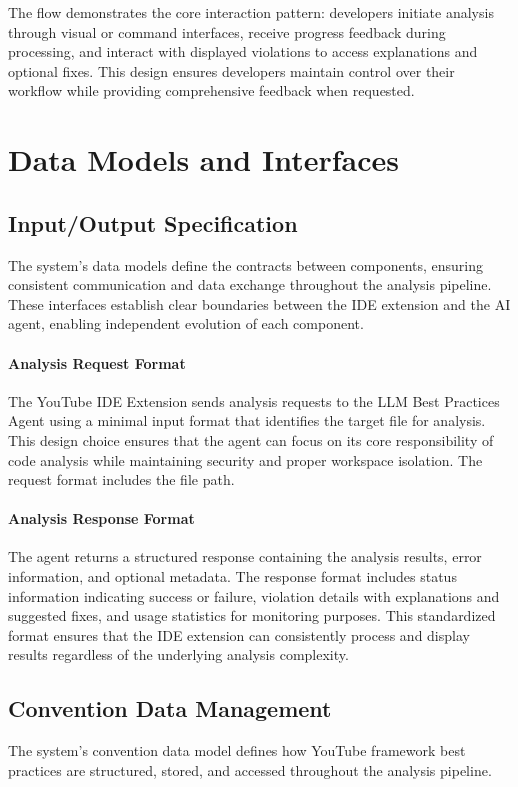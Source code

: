 \begin{spacing}{1.2}
The flow demonstrates the core interaction pattern: developers initiate analysis through visual or command interfaces, receive progress feedback during processing, and interact with displayed violations to access explanations and optional fixes. This design ensures developers maintain control over their workflow while providing comprehensive feedback when requested.


\section{Data Models and Interfaces}

\subsection{Input/Output Specification}
The system's data models define the contracts between components, ensuring consistent communication and data exchange throughout the analysis pipeline. These interfaces establish clear boundaries between the IDE extension and the AI agent, enabling independent evolution of each component.

\paragraph{Analysis Request Format}
The YouTube IDE Extension sends analysis requests to the LLM Best Practices Agent using a minimal input format that identifies the target file for analysis. This design choice ensures that the agent can focus on its core responsibility of code analysis while maintaining security and proper workspace isolation. The request format includes the file path.

\paragraph{Analysis Response Format}
The agent returns a structured response containing the analysis results, error information, and optional metadata. The response format includes status information indicating success or failure, violation details with explanations and suggested fixes, and usage statistics for monitoring purposes. This standardized format ensures that the IDE extension can consistently process and display results regardless of the underlying analysis complexity.

\subsection{Convention Data Management}
The system's convention data model defines how YouTube framework best practices are structured, stored, and accessed throughout the analysis pipeline.


\end{spacing}
